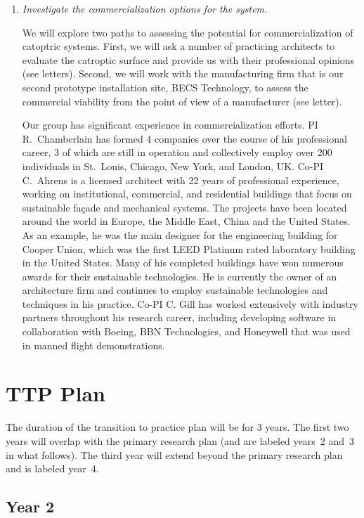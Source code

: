 \documentclass[11pt]{article}
\begin{document}
\begin{enumerate}
\item \emph{Investigate the commercialization options for the system.}

We will explore two paths to assessing the potential for commercialization
of catoptric systems.
First, we will ask a number of practicing architects to evaluate the
catroptic surface and provide us with their professional opinions
(see letters).
Second, we will work with the manufacturing firm that is our second
prototype installation site, BECS Technology, to assess the commercial
viability from the point of view of a manufacturer (see letter).

Our group has significant experience in commercialization efforts.
PI R.~Chamberlain has formed 4 companies over the course of his professional
career, 3 of which are still in operation and collectively employ
over 200 individuals in St.~Louis, Chicago, New York, and London, UK.
Co-PI C.~Ahrens is a licensed architect with 22 years of professional
experience, working on institutional, commercial, and residential
buildings that focus on sustainable fa\c{c}ade and mechanical systems.
The projects have been located around the world in Europe, the Middle East,
China and the United States. As an example, he was the main designer for
the engineering building for Cooper Union, which was the first
LEED Platinum rated laboratory building in the United States.
Many of his completed buildings have won numerous awards for their
sustainable technologies.
He is currently the owner of an architecture firm and continues
to employ sustainable technologies and techniques in his practice.  
Co-PI C. Gill has worked extensively with industry partners throughout his
research career, including developing software in collaboration with Boeing, 
BBN Technologies, and Honeywell that was used in manned flight demonstrations.

\end{enumerate}

\section{TTP Plan}

The duration of the transition to practice plan will be for 3 years.
The first two years will overlap with the primary research plan (and
are labeled years~2 and~3 in what follows).  The third year will extend
beyond the primary research plan and is labeled year~4.

\subsection{Year 2}
\end{document}
